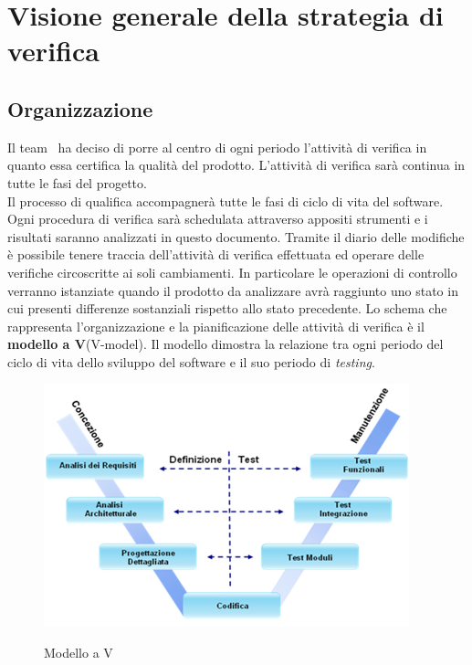\section{Visione generale della strategia di verifica}
\subsection{Organizzazione}
Il team \gruppo ~ha deciso di porre al centro di ogni periodo l'attività di verifica in quanto essa certifica la qualità del prodotto. L'attività di verifica sarà continua in tutte le fasi del progetto.\\
Il processo di qualifica accompagnerà tutte le fasi di ciclo di vita del software. Ogni procedura di verifica sarà schedulata attraverso appositi strumenti e i risultati saranno analizzati in questo documento. Tramite il diario delle modifiche è possibile tenere traccia dell'attività di verifica effettuata ed operare delle verifiche circoscritte ai soli cambiamenti.
In particolare le operazioni di controllo verranno istanziate quando il prodotto da analizzare avrà raggiunto uno stato in cui presenti differenze sostanziali rispetto allo stato precedente.
Lo schema che rappresenta l'organizzazione e la pianificazione delle attività di verifica è il \textbf{modello a V}(V-model). Il modello dimostra la relazione tra ogni periodo del ciclo di vita dello sviluppo del software e il suo periodo di \textit{testing}.
\begin{figure} [H]
\centering
     \includegraphics[scale=0.8]{../modello/img/V}\\
     \caption{Modello a V}\label{fig:1}
\end{figure}

